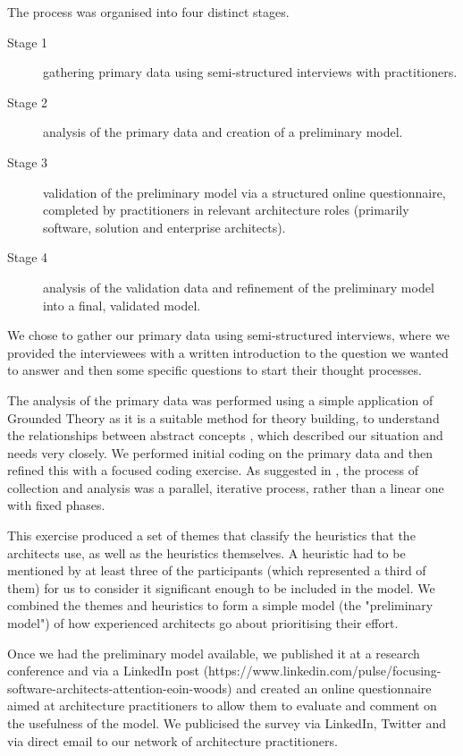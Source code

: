 The process was organised into four distinct stages.

\begin{description}
	\item [Stage 1] gathering primary data using semi-structured interviews with practitioners.
	\item [Stage 2] analysis of the primary data and creation of a preliminary model.
	\item [Stage 3] validation of the preliminary model via a structured online questionnaire, completed by practitioners in relevant architecture roles (primarily software, solution and enterprise architects).
	\item [Stage 4] analysis of the validation data and refinement of the preliminary model into a final, validated model.
\end{description}

We chose to gather our primary data using semi-structured interviews, where we provided the interviewees with a written introduction to the question we wanted to answer and then some specific questions to start their thought processes. 

The analysis of the primary data was performed using a simple application of Grounded Theory as it is a suitable method for theory building, to understand the relationships between abstract concepts \cite{charmaz2006-groundedtheory}, which described our situation and needs very closely.  We performed initial coding on the primary data and then refined this with a focused coding exercise.  As suggested in \cite{lapan2012-qualitativeresearch}, the process of collection and analysis was a parallel, iterative process, rather than a linear one with fixed phases.  

This exercise produced a set of themes that classify the heuristics that the architects use, as well as the heuristics themselves.  A heuristic had to be mentioned by at least three of the participants (which represented a third of them) for us to consider it significant enough to be included in the model.  We combined the themes and heuristics to form a simple model (the "preliminary model") of how experienced architects go about prioritising their effort. 

Once we had the preliminary model available, we published it at a research conference \cite{woods2017-archpriorisation} and via a LinkedIn post (https://www.linkedin.com/pulse/focusing-software-architects-attention-eoin-woods) and created an online questionnaire aimed at architecture practitioners to allow them to evaluate and comment on the usefulness of the model.  We publicised the survey via LinkedIn, Twitter and via direct email to our network of architecture practitioners.

